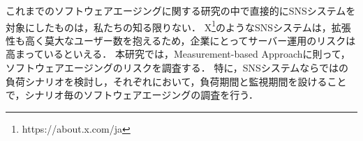 \documentclass[twoside,twocolumn,10pt]{jarticle}  %
\begin{document}
これまでのソフトウェアエージングに関する研究の中で直接的にSNSシステムを対象にしたものは，私たちの知る限りない．
X\footnote{https://about.x.com/ja}のようなSNSシステムは，拡張性も高く莫大なユーザー数を抱えるため，企業にとってサーバー運用のリスクは高まっているといえる．
本研究では，Measurement-based Approach\cite{Dohi2020Handbook}に則って，ソフトウェアエージングのリスクを調査する．
特に，SNSシステムならではの負荷シナリオを検討し，それぞれにおいて，負荷期間と監視期間\cite{Torquato2018SWAREa}を設けることで，シナリオ毎のソフトウェアエージングの調査を行う．
\end{document}
